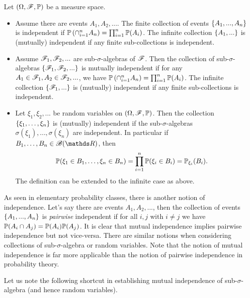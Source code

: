 \begin{definition} Let $(\Omega,\mathcal{F},\mathbb{P})$ be a measure space.
\begin{itemize}
\item Assume there are events $A_1, A_2, ...$. The finite collection of events $\left\{ A_1, ..., A_n \right \}$ is independent if $\mathbb{P}\left( \cap_{i=1}^n A_n \right) = \prod_{i=1}^n \mathbb{P}(A_i)$. The infinite collection $\left\{ A_1,... \right \}$ is (mutually) independent if any finite sub-collections is independent. \\
\item Assume $\mathcal{F}_1, \mathcal{F}_2, ...$ are sub-$\sigma$-algebras of $\mathcal{F}$. Then the collection of sub-$\sigma$-algebras $\left\{ \mathcal{F}_1, \mathcal{F}_2, ... \right \}$ is mutually independent if for any $A_1 \in \mathcal{F}_1, A_2 \in \mathcal{F}_2, ...$, we have $\mathbb{P}\left( \cap_{i=1}^n A_n \right) = \prod_{i=1}^n \mathbb{P}(A_i)$. The infinite collection $\left\{ \mathcal{F}_1,... \right \}$ is (mutually) independent if any finite sub-collections is independent.
\item Let $\xi_1, \xi_2, ...$ be random variables on $(\Omega, \mathcal{F}, \mathbb{P})$. Then the collection $\left\{ \xi_1, \dots, \xi_n \right \}$ is (mutually) independent if the sub-$\sigma$-algebras $\sigma(\xi_1), ..., \sigma(\xi_n)$ are independent. In particular if $B_1, \dots, B_n \in \B(\R)$, then
\begin{equation*}
    \mathbb{P}(\xi_1 \in B_1,\dots, \xi_n \in B_n) = \prod_{i=1}^n \mathbb{P}(\xi_i \in B_i) = \mathbb{P}_{\xi_i}(B_i).
\end{equation*}
The definition can be extended to the infinite case as above.
\end{itemize}
\end{definition}

\begin{remark}
As seen in elementary probability classes, there is another notion of independence. Let's say there are events $A_1, A_2, ...$, then the collection of events $\left\{ A_1, ..., A_n \right \}$ is \textit{pairwise} independent if for all $i,j$ with $i \neq j$ we have $\mathbb{P}(A_i \cap A_j) = \mathbb{P}(A_i) \mathbb{P}(A_j)$. It is clear that mutual independence implies pairwise independence but not vice-versa. There are similar notions when considering collections of sub-$\sigma$-algebra or random variables. Note that the notion of mutual independence is far more applicable than the notion of pairwise independence in probability theory. 
\end{remark}

Let us note the following shortcut in establishing mutual independence of sub-$\sigma$-algebra (and hence random variables).

